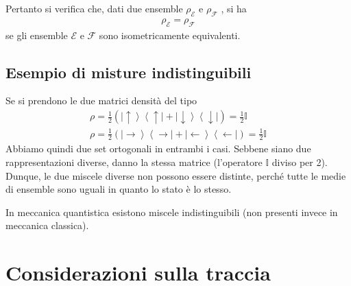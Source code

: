 Pertanto si verifica che, dati due ensemble $\rho_{\mathcal{E}}$ e $\rho_{\mathcal{F}}$ , si ha
\begin{equation}\begin{split}
\rho_{\mathcal{E}} = \rho_{\mathcal{F}}
\end{split}\end{equation}
se gli ensemble $\mathcal{E}$ e $\mathcal{F}$ sono isometricamente equivalenti.


\subsection{Esempio di misture indistinguibili} %
Se si prendono le due matrici densità del tipo
\begin{equation}\begin{split}
\rho=\frac{1}{2}\left(\left |\uparrow \right\rangle\left\langle \uparrow\right |+\left |\downarrow \right\rangle\left\langle \downarrow\right |\right)=\frac{1}{2}\mathbb{I} \\
\rho=\frac{1}{2}\left(\left |\rightarrow \right\rangle\left\langle \rightarrow\right |+\left |\leftarrow \right\rangle\left\langle \leftarrow\right |\right)=\frac{1}{2}\mathbb{I}
\end{split}\end{equation}
Abbiamo quindi due set ortogonali in entrambi i casi. Sebbene siano due rappresentazioni diverse, danno la stessa matrice (l'operatore $\mathbb{I}$ diviso per 2). Dunque, le due miscele diverse non possono essere distinte, perché tutte le medie di ensemble sono uguali in quanto lo stato è lo stesso. 

In meccanica quantistica esistono miscele indistinguibili (non presenti invece in meccanica classica).


\section{Considerazioni sulla traccia} %

